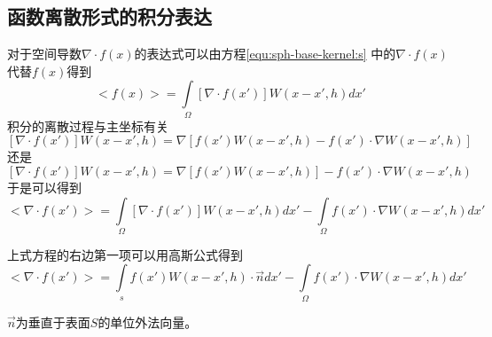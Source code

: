 \subsection{函数离散形式的积分表达}
\label{subsec:fun-dis-int-equ}

对于空间导数$\nabla{}\cdot{}f(x)$的表达式可以由方程\ref{equ:sph-base-kernel:s}
中的$\nabla{}\cdot{}f(x)$代替$f(x)$得到
\begin{equation}
\label{equ:shp-function-dis}
<f(x)> = \int\limits_\Omega{}\left[{}\nabla{}\cdot{}f(x')\right]{}W(x-x',h)dx'
\end{equation}
积分的离散过程与主坐标有关
\begin{equation}
\left[{}\nabla{}\cdot{}f(x')\right]{}W(x-x',h) = 
\nabla\left[{}f(x')W(x-x',h)-f(x')\cdot\nabla{}W(x-x',h)\right]
\end{equation}
还是
\begin{equation}
\left[{}\nabla{}\cdot{}f(x')\right]{}W(x-x',h) = 
\nabla\left[{}f(x')W(x-x',h)\right]{}-f(x')\cdot\nabla{}W(x-x',h)
\end{equation}
于是可以得到
\begin{equation}
<\nabla{}\cdot{}f(x')> 
= \int\limits_\Omega{}\left[{}\nabla{}\cdot{}f(x')\right]{}W(x-x',h)dx' 
- \int\limits_\Omega{}f(x')\cdot\nabla{}W(x-x',h)dx'
\end{equation}

上式方程的右边第一项可以用高斯公式得到
\begin{equation}
\label{equ:sph-dis-int-guass}
<\nabla{}\cdot{}f(x')> 
= \int\limits_s f(x') W(x-x',h)\cdot\vec{n}dx'
- \int\limits_\Omega{}f(x')\cdot\nabla{}W(x-x',h)dx'
\end{equation}

$\vec{n}$为垂直于表面$S$的单位外法向量。


